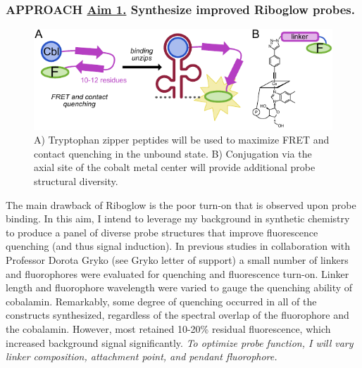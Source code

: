 \subsubsection*{APPROACH \underline{Aim 1.} Synthesize improved Riboglow probes.}
\begin{figure}
\begin{centering}
\includegraphics[width=\textwidth]{figures/aim1v3.pdf}
\end{centering}
\footnotesize
\caption{\label{figure:CblConstructs}
A) Tryptophan zipper peptides will be used to maximize FRET and contact quenching in the unbound state. B) Conjugation via the axial site of the cobalt metal center will provide additional probe structural diversity.
}
\end{figure}
The main drawback of Riboglow is the poor turn-on that is observed upon probe binding. In this aim, I intend to leverage my background in synthetic chemistry to produce a panel of diverse probe structures that improve fluorescence quenching (and thus signal induction). In previous studies in collaboration with Professor Dorota Gryko (see Gryko letter of support) a small number of linkers and fluorophores were evaluated for quenching and fluorescence turn-on. Linker length and fluorophore wavelength were varied to gauge the quenching ability of cobalamin. Remarkably, some degree of quenching occurred in all of the constructs synthesized, regardless of the spectral overlap of the fluorophore and the cobalamin. However, most retained 10-20\% residual fluorescence, which increased background signal significantly. \textit{To optimize probe function, I will vary linker composition, attachment point, and pendant fluorophore.}
